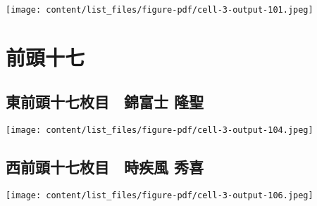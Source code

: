\documentclass[
  letterpaper,
]{bxjsbook}
\begin{document}
\texttt{[image: content/list\_files/figure-pdf/cell-3-output-101.jpeg]}

\section{前頭十七}\label{ux524dux982dux5341ux4e03}

\subsection{東前頭十七枚目　錦富士
隆聖}\label{ux6771ux524dux982dux5341ux4e03ux679aux76ee-ux9326ux5bccux58eb-ux9686ux8056}

\texttt{[image: content/list\_files/figure-pdf/cell-3-output-104.jpeg]}

\subsection{西前頭十七枚目　時疾風
秀喜}\label{ux897fux524dux982dux5341ux4e03ux679aux76ee-ux6642ux75beux98a8-ux79c0ux559c}

\texttt{[image: content/list\_files/figure-pdf/cell-3-output-106.jpeg]}
\end{document}
